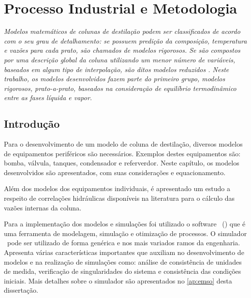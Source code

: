 %
%
%
\chapter{Processo Industrial e Metodologia}
\label{chap:moddesenvolvidos}


\emph{Modelos matemáticos de colunas de destilação podem ser classificados de acordo com o seu grau de detalhamento:
se possuem predição da composição, temperatura e vazões para cada prato, são chamados de modelos rigorosos. Se são
compostos por uma descrição global da coluna utilizando um menor número de variáveis, baseados em algum tipo de
interpolação, são ditos modelos reduzidos \cite{Fletcher:2000}. Neste trabalho, os modelos desenvolvidos fazem parte do
primeiro
grupo, modelos rigorosos, prato-a-prato, baseados na consideração de equilíbrio termodinâmico entre as fases líquida e
vapor.
}

\section{Introdução}

Para o desenvolvimento de um modelo de coluna de destilação, diversos modelos
de equipamentos periféricos são necessários. Exemplos destes equipamentos são:
bomba, válvula, tanques, condensador e referverdor.
Neste capítulo, os modelos desenvolvidos são apresentados, com suas
considerações e equacionamento.

Além dos modelos dos equipamentos individuais, é apresentado um estudo a
respeito de correlações hidráulicas disponíveis na literatura para o cálculo
das vazões internas da coluna.

Para a implementação dos modelos e simulações foi utilizado o software \emso\
(\emsoname) que é uma ferramenta de modelagem, simulação e
otimização de processos.
O simulador \emso\ pode ser utilizado de forma genérica e nos mais variados
ramos da engenharia. Apresenta várias características importantes que auxiliam
no desenvolvimento de modelos e na realização de simulações como: análise de
consistência de unidades de medida, verificação de singularidades do sistema e
consistência das condições iniciais. Mais detalhes sobre o simulador são
apresentados no \autoref{ap:emso} desta dissertação.


